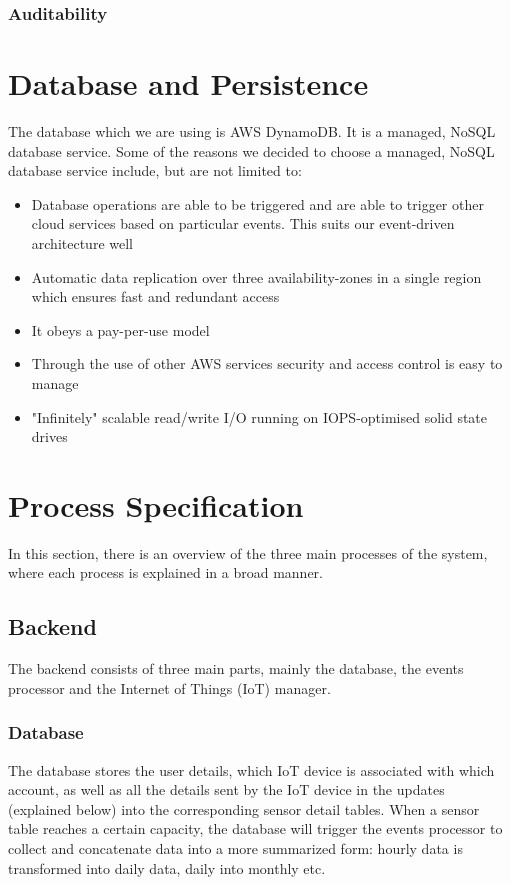\documentclass{article}
\begin{document}
\subsubsection{Auditability}

\section{Database and Persistence}
	The database which we are using is AWS DynamoDB. It is a managed, NoSQL database service. Some of the reasons we decided to choose a managed, NoSQL database service include, but are not limited to:
	\begin{itemize}
		\item Database operations are able to be triggered and are able to trigger other cloud services based on particular events. This suits our event-driven architecture well
		\item Automatic data replication over three availability-zones in a single region which ensures fast and redundant access
		\item It obeys a pay-per-use model
		\item Through the use of other AWS services security and access control is easy to manage
		\item "Infinitely" scalable read/write I/O running on IOPS-optimised solid state drives
	\end{itemize}

\section{Process Specification}
	In this section, there is an overview of the three main processes of the system, where each process is explained in a broad manner.
	
	\subsection{Backend}
		The backend consists of three main parts, mainly the database, the events processor and the Internet of Things (IoT) manager.
		
		\subsubsection{Database}
			The database stores the user details, which IoT device is associated with which account, as well as all the details sent by the IoT device in the updates (explained below) into the corresponding sensor detail tables. When a sensor table reaches a certain capacity, the database will trigger the events processor to collect and concatenate data into a more summarized form: hourly data is transformed into daily data, daily into monthly etc.
		
\end{document}
